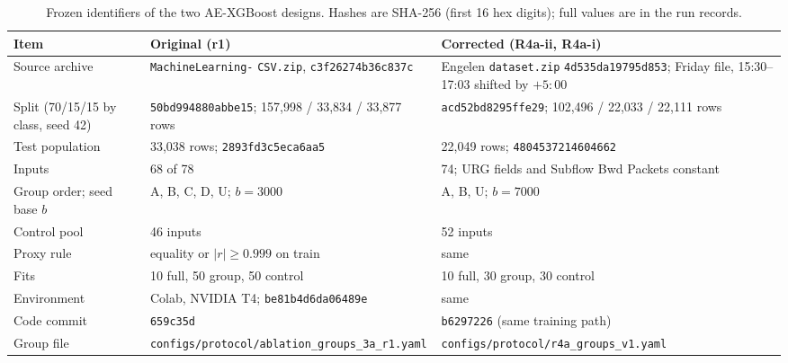 \documentclass[journal]{IEEEtran}
\begin{document}
\begin{table}[!ht]
\centering
\caption{\upshape Frozen identifiers of the two AE-XGBoost designs. Hashes are SHA-256 (first 16 hex
digits); full values are in the run records.}
\label{tab:repro}
\footnotesize\setlength{\tabcolsep}{3pt}\renewcommand{\arraystretch}{1.12}
\begin{tabular}{@{}L{1.75cm}L{3.05cm}L{3.05cm}@{}}
\toprule
Item & Original (r1) & Corrected (R4a-ii, R4a-i) \\
\midrule
Source archive & \texttt{MachineLearning-} \texttt{CSV.zip}, \texttt{c3f26274b36c837c} & Engelen \texttt{dataset.zip} \texttt{4d535da19795d853}; Friday file, 15:30--17:03 shifted by $+5{:}00$ \\
Split (70/15/15 by class, seed 42) & \texttt{50bd994880abbe15}; 157,998 / 33,834 / 33,877 rows & \texttt{acd52bd8295ffe29}; 102,496 / 22,033 / 22,111 rows \\
Test population & 33,038 rows; \texttt{2893fd3c5eca6aa5} & 22,049 rows; \texttt{4804537214604662} \\
Inputs & 68 of 78 & 74; URG fields and Subflow Bwd Packets constant \\
Group order; seed base $b$ & A, B, C, D, U; $b=3000$ & A, B, U; $b=7000$ \\
Control pool & 46 inputs & 52 inputs \\
Proxy rule & equality or $|r|\ge0.999$ on train & same \\
Fits & 10 full, 50 group, 50 control & 10 full, 30 group, 30 control \\
Environment & Colab, NVIDIA T4; \texttt{be81b4d6da06489e} & same \\
Code commit & \texttt{659c35d} & \texttt{b6297226} (same training path) \\
Group file & \nolinkurl{configs/protocol/ablation_groups_3a_r1.yaml} & \nolinkurl{configs/protocol/r4a_groups_v1.yaml} \\
\bottomrule
\end{tabular}
\end{table}
\end{document}
